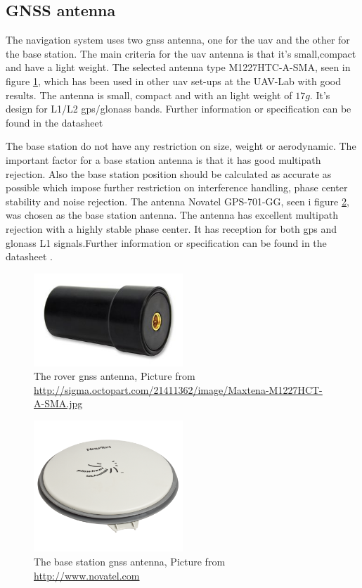 \subsection{GNSS antenna}
The navigation system uses two \gls{gnss} antenna, one for the \gls{uav} and the other for the base station. The main criteria for the \gls{uav} antenna is that it's small,compact and have a light weight.
The selected antenna type M1227HTC-A-SMA, seen in figure \ref{figure:Maxtena}, which has been used in other \gls{uav} set-ups at the UAV-Lab with good results. The antenna is small, compact and with an light weight of $17g$. It's design for L1/L2 gps/glonass bands. Further information or specification can be found in the datasheet \citep{maxtena}

The base station do not have any restriction on size, weight or aerodynamic. The important factor for a base station antenna is that it has good multipath rejection. Also the base station position should be calculated as accurate as possible which impose further restriction on interference handling, phase center stability and noise rejection.
The antenna Novatel GPS-701-GG, seen i figure \ref{figure:Novatel}, was chosen as the base station antenna. The antenna has excellent multipath rejection with a highly stable phase center. It has reception for both \gls{gps} and \gls{glonass} L1 signals.Further information or specification can be found in the datasheet \citep{novatel}.

\begin{figure}[H]
	\centering
		\includegraphics[width=0.5\textwidth]{figs/Maxtena-M1227HCT-A-SMA-image.jpg}
		\caption{The rover \gls{gnss} antenna, Picture from \url{http://sigma.octopart.com/21411362/image/Maxtena-M1227HCT-A-SMA.jpg}}
		\label{figure:Maxtena}
\end{figure}

\begin{figure}[H]
	\centering
		\includegraphics[width=0.5\textwidth]{figs/702-L.png}
		\caption{The base station \gls{gnss} antenna, Picture from \url{http://www.novatel.com}}
		\label{figure:Novatel}
\end{figure}


